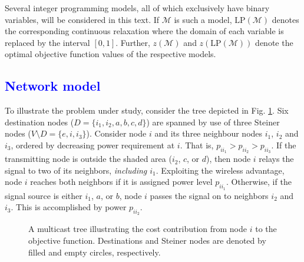 Several integer programming models, all of which exclusively have binary variables, will be considered in this text.
If $\mathcal{M}$ is such a model, $\text{LP}(\mathcal{M})$ denotes the corresponding continuous relaxation
where the domain of each variable is replaced by the interval $[0,1]$.
Further, $z\left(\mathcal{M}\right)$ and $z\left(\text{LP}(\mathcal{M})\right)$ denote the optimal objective function values of the respective models.


\textcolor{blue}{\subsection{Network model} \label{sec:netmod}}

To illustrate the problem under study, consider the tree depicted in Fig. \ref{fig:objexp}.
Six destination nodes ($D=\{i_1,i_2,a,b,c,d\}$) are spanned by use of three Steiner nodes ($V\setminus D = \{e,i,i_3\}$).
Consider node $i$ and its three neighbour nodes $i_1$, $i_2$ and $i_3$, ordered by decreasing power requirement at $i$.
That is, $p_{ii_1}>p_{ii_2}>p_{ii_3}$.
If the transmitting node is outside the shaded area ($i_2$, $c$, or $d$), then node $i$ relays the signal to two of its neighbors, \emph{including $i_1$}.
Exploiting the wireless advantage, node $i$ reaches both neighbors if it is assigned power level $p_{ii_1}$.
Otherwise, if the signal source is either $i_1$, $a$, or $b$, node $i$ passes the signal on to neighbors $i_2$ and $i_3$.
This is accomplished by power $p_{ii_2}$.

\begin{figure}[h!]
\centering
{}
\caption{A multicast tree illustrating the cost contribution from node $i$ to the objective function.
	 Destinations and Steiner nodes are denoted by filled and empty circles, respectively.}
\label{fig:objexp}
\end{figure}

